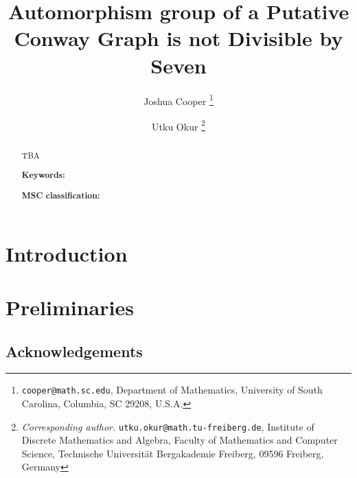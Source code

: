 \documentclass[12pt]{article}
\numberwithin{equation}{section}
\theoremstyle{definition}
\begin{document}
\title{Automorphism group of a Putative Conway Graph is not Divisible by Seven}

\author{
Joshua Cooper \thanks{\texttt{cooper@math.sc.edu}, Department of Mathematics, University of South Carolina, Columbia, SC 29208, U.S.A.} 
\and
Utku Okur
\thanks{\textit{Corresponding author.} \texttt{utku.okur@math.tu-freiberg.de}, Institute of Discrete Mathematics and Algebra, Faculty of Mathematics and Computer Science, Technische Universit\"at Bergakademie Freiberg, 09596 Freiberg, Germany}
}

\date{}
\maketitle

\begin{abstract}
TBA

\medskip

\noindent \textbf{Keywords:} 

\noindent \textbf{MSC classification:}  
\end{abstract}



\section{Introduction}


\section{Preliminaries}

\cite{CaDiCaL}

\subsection*{Acknowledgements}
\raggedright

\printbibliography 
\end{document}
